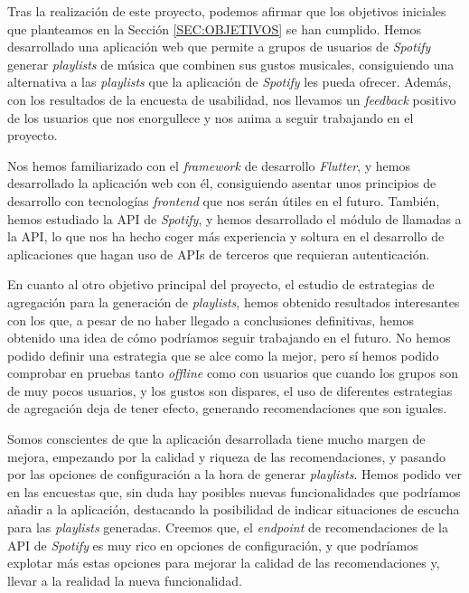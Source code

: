 Tras la realización de este proyecto, podemos afirmar que los objetivos iniciales que planteamos en la Sección \ref{SEC:OBJETIVOS} se han cumplido.
Hemos desarrollado una aplicación web que permite a grupos de usuarios de \textit{Spotify} generar \textit{playlists} de música que combinen sus gustos musicales, consiguiendo 
una alternativa a las \textit{playlists} que la aplicación de \textit{Spotify} les pueda ofrecer. Además, con los resultados de la encuesta de usabilidad, nos llevamos un \textit{feedback}
positivo de los usuarios que nos enorgullece y nos anima a seguir trabajando en el proyecto.

Nos hemos familiarizado con el \textit{framework} de desarrollo \textit{Flutter}, y hemos desarrollado la aplicación web con él, consiguiendo asentar unos principios de desarrollo con tecnologías
\textit{frontend} que nos serán útiles en el futuro. También, hemos estudiado la API de \textit{Spotify}, y hemos desarrollado el módulo de llamadas a la API, lo que nos ha hecho coger más experiencia
y soltura en el desarrollo de aplicaciones que hagan uso de APIs de terceros que requieran autenticación.

En cuanto al otro objetivo principal del proyecto, el estudio de estrategias de agregación para la generación de \textit{playlists}, hemos obtenido resultados interesantes con los que, a pesar
de no haber llegado a conclusiones definitivas, hemos obtenido una idea de cómo podríamos seguir trabajando en el futuro. No hemos podido definir una estrategia que se alce como la mejor, pero
sí hemos podido comprobar en pruebas tanto \textit{offline} como con usuarios que cuando los grupos son de muy pocos usuarios, y los gustos son dispares, el uso de diferentes estrategias de agregación
deja de tener efecto, generando recomendaciones que son iguales.

Somos conscientes de que la aplicación desarrollada tiene mucho margen de mejora, empezando por la calidad y riqueza de las recomendaciones, y pasando por las opciones de configuración a la hora de generar
\textit{playlists}. Hemos podido ver en las encuestas que, sin duda hay posibles nuevas funcionalidades que podríamos añadir a la aplicación, destacando la posibilidad de indicar situaciones de escucha para 
las \textit{playlists} generadas. Creemos que, el \textit{endpoint} de recomendaciones de la API de \textit{Spotify} es muy rico en opciones de configuración, y que podríamos explotar más estas opciones para
mejorar la calidad de las recomendaciones y, llevar a la realidad la nueva funcionalidad.

